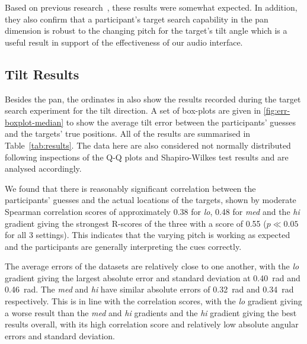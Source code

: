 \documentclass[sigconf, screen=true, anonymous=true]{acmart}
\begin{document}
Based on previous research~\cite{zwiers2001spatial}, these results were somewhat expected.
In addition, they also confirm that a participant's target search capability in the pan dimension is robust to the changing pitch for the target's tilt angle which is a useful result in support of the effectiveness of our audio interface.

\subsection{Tilt Results}\label{sec:tilt-results}

Besides the pan, the ordinates in  also show the results recorded during the target search experiment for the tilt direction.
A set of box-plots are given in \cref{fig:err-boxplot-median} to show the average tilt error between the participants' guesses and the targets' true positions.
All of the results are summarised in Table~\ref{tab:results}. 
The data here are also considered not normally distributed following inspections of the Q-Q plots and Shapiro-Wilkes test results and are analysed accordingly.

We found that there is reasonably significant correlation between the participants' guesses and the actual locations of the targets, shown by moderate Spearman correlation scores of approximately 0.38 for \emph{lo}, 0.48 for \emph{med} and the \emph{hi} gradient giving the strongest R-scores of the three with a score of 0.55 ($p \ll 0.05$ for all 3 settings).
This indicates that the varying pitch is working as expected and the participants are generally interpreting the cues correctly. 

The average errors of the datasets are relatively close to one another, with the \emph{lo} gradient giving the largest absolute error and standard deviation at \SI{0.40}{\radian} and \SI{0.46}{\radian}.
The \emph{med} and \emph{hi} have similar absolute errors of \SI{0.32}{\radian} and \SI{0.34}{\radian} respectively.
This is in line with the correlation scores, with the \emph{lo} gradient giving a worse result than the \emph{med} and \emph{hi} gradients and the \emph{hi} gradient giving the best results overall, with its high correlation score and relatively low absolute angular errors and standard deviation. 
\end{document}

